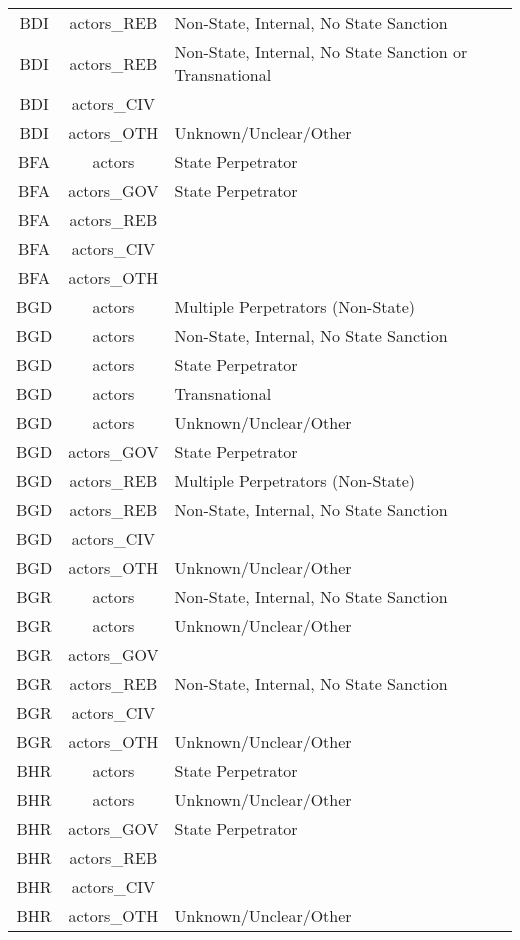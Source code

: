 \documentclass[12pt]{article}
\begin{document}
\begin{center}
\begin{longtable}{|c|c|p{10cm}|}
  BDI & actors\_REB & Non-State, Internal, No State Sanction \\ 
  BDI & actors\_REB & Non-State, Internal, No State Sanction or Transnational \\ 
  BDI & actors\_CIV &  \\ 
  BDI & actors\_OTH & Unknown/Unclear/Other \\ 
  BFA & actors & State Perpetrator \\ 
  BFA & actors\_GOV & State Perpetrator \\ 
  BFA & actors\_REB &  \\ 
  BFA & actors\_CIV &  \\ 
  BFA & actors\_OTH &  \\ 
  BGD & actors & Multiple Perpetrators (Non-State) \\ 
  BGD & actors & Non-State, Internal, No State Sanction \\ 
  BGD & actors & State Perpetrator \\ 
  BGD & actors & Transnational \\ 
  BGD & actors & Unknown/Unclear/Other \\ 
  BGD & actors\_GOV & State Perpetrator \\ 
  BGD & actors\_REB & Multiple Perpetrators (Non-State) \\ 
  BGD & actors\_REB & Non-State, Internal, No State Sanction \\ 
  BGD & actors\_CIV &  \\ 
  BGD & actors\_OTH & Unknown/Unclear/Other \\ 
  BGR & actors & Non-State, Internal, No State Sanction \\ 
  BGR & actors & Unknown/Unclear/Other \\ 
  BGR & actors\_GOV &  \\ 
  BGR & actors\_REB & Non-State, Internal, No State Sanction \\ 
  BGR & actors\_CIV &  \\ 
  BGR & actors\_OTH & Unknown/Unclear/Other \\ 
  BHR & actors & State Perpetrator \\ 
  BHR & actors & Unknown/Unclear/Other \\ 
  BHR & actors\_GOV & State Perpetrator \\ 
  BHR & actors\_REB &  \\ 
  BHR & actors\_CIV &  \\ 
  BHR & actors\_OTH & Unknown/Unclear/Other \\ 

\end{longtable}
\end{center}
\end{document}
